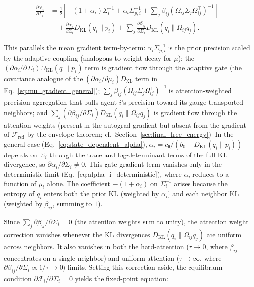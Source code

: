 \documentclass[twoside,11pt]{article}
\begin{document}
\begin{equation}
\boxed{
\begin{aligned}
\frac{\partial \mathcal{F}_i}{\partial \Sigma_i}
&= \frac{1}{2}
\left[
-(1+\alpha_i) \Sigma_i^{-1}
+ \alpha_i \Sigma_{p,i}^{-1}
+ \sum_j \beta_{ij} 
(\Omega_{ij}\Sigma_j\Omega_{ij}^\top)^{-1}
\right] \\
&\quad + \frac{\partial \alpha_i}{\partial \Sigma_i} 
  D_{\mathrm{KL}}(q_i \| p_i)
+ \sum_j \frac{\partial \beta_{ij}}{\partial \Sigma_i} 
D_{\mathrm{KL}}(q_i \| \Omega_{ij} q_j).
\end{aligned}
}
\label{eq:Sigma_gradient_main}
\end{equation}

This parallels the mean gradient term-by-term: $\alpha_i \Sigma_{p,i}^{-1}$ is the prior precision scaled by the adaptive coupling (analogous to weight decay for $\mu$); the $(\partial\alpha_i/\partial\Sigma_i) D_{\mathrm{KL}}(q_i \| p_i)$ term is gradient flow through the adaptive gate (the covariance analogue of the $(\partial\alpha_i/\partial\mu_i) D_{\mathrm{KL}}$ term in Eq.~\ref{eq:mu_gradient_general}); $\sum_j \beta_{ij}(\Omega_{ij}\Sigma_j\Omega_{ij}^\top)^{-1}$ is attention-weighted precision aggregation that pulls agent $i$'s precision toward its gauge-transported neighbors; and $\sum_j (\partial \beta_{ij}/\partial \Sigma_i) D_{\mathrm{KL}}(q_i \| \Omega_{ij} q_j)$ is gradient flow through the attention weights (present in the autograd gradient but absent from the gradient of $\mathcal{F}_{\mathrm{red}}$ by the envelope theorem; cf.\ Section~\ref{sec:final_free_energy}). In the general case (Eq.~\ref{eq:state_dependent_alpha}), $\alpha_i = c_0/(b_0 + D_{\mathrm{KL}}(q_i \| p_i))$ depends on $\Sigma_i$ through the trace and log-determinant terms of the full KL divergence, so $\partial\alpha_i/\partial\Sigma_i \neq 0$. This gate gradient term vanishes only in the deterministic limit (Eq.~\ref{eq:alpha_i_deterministic}), where $\alpha_i$ reduces to a function of $\mu_i$ alone. The coefficient $-(1+\alpha_i)$ on $\Sigma_i^{-1}$ arises because the entropy of $q_i$ enters both the prior KL (weighted by $\alpha_i$) and each neighbor KL (weighted by $\beta_{ij}$, summing to $1$).

Since $\sum_j \partial \beta_{ij}/\partial \Sigma_i = 0$ (the attention weights sum to unity), the attention weight correction vanishes whenever the KL divergences $D_{\mathrm{KL}}(q_i \| \Omega_{ij}q_j)$ are uniform across neighbors. It also vanishes in both the hard-attention ($\tau \to 0$, where $\beta_{ij}$ concentrates on a single neighbor) and uniform-attention ($\tau \to \infty$, where $\partial\beta_{ij}/\partial\Sigma_i \propto 1/\tau \to 0$) limits. Setting this correction aside, the equilibrium condition $\partial \mathcal{F}_i / \partial \Sigma_i = 0$ yields the fixed-point equation:
\end{document}
